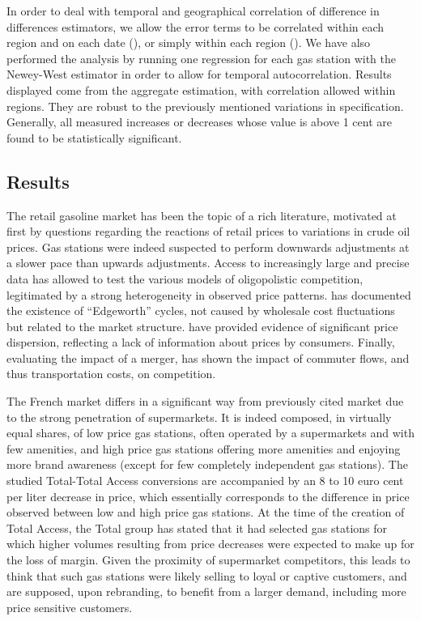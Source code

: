 \documentclass[english]{article}
\begin{document}
In order to deal with temporal and geographical correlation of difference in differences estimators, we allow the error terms to be correlated within each region and on each date  (\cite{BER04}), or simply within each region (\cite{CAM15}). We have also performed the analysis by running one regression for each gas station with the Newey-West estimator in order to allow for temporal autocorrelation. Results displayed come from the aggregate estimation, with correlation allowed within regions. They are robust to the previously mentioned variations in specification. Generally, all measured increases or decreases whose value is above 1 cent are found to be statistically significant.

\subsection{Results}

The retail gasoline market has been the topic of a rich literature, motivated at first by questions regarding the reactions of retail prices to variations in crude oil prices. Gas stations were indeed suspected to perform downwards adjustments at a slower pace than upwards adjustments. Access to increasingly large and precise data has allowed to test the various models of oligopolistic competition, legitimated by a strong heterogeneity in observed price patterns. \cite{ECK13} has documented the existence of “Edgeworth” cycles, not caused by wholesale cost fluctuations but related to the market structure. \cite{CHA11} have provided evidence of significant price dispersion, reflecting a lack of information about prices by consumers. Finally, evaluating the impact of a merger, \cite{HOU12} has shown the impact of commuter flows, and thus transportation costs, on competition.\medskip{}

The French market differs in a significant way from previously cited market due to the strong penetration of supermarkets. It is indeed composed, in virtually equal shares, of low price gas stations, often operated by a supermarkets and with few amenities, and high price gas stations offering more amenities and enjoying more brand awareness (except for few completely independent gas stations). The studied Total-Total Access conversions are accompanied by an 8 to 10 euro cent per liter decrease in price, which essentially corresponds to the difference in price observed between low and high price gas stations. At the time of the creation of Total Access, the Total group has stated that it had selected gas stations for which higher volumes resulting from price decreases were expected to make up for the loss of margin. Given the proximity of supermarket competitors, this leads to think that such gas stations were likely selling to loyal or captive customers, and are supposed, upon rebranding, to benefit from a larger demand, including more price sensitive customers.\medskip{}
\end{document}

